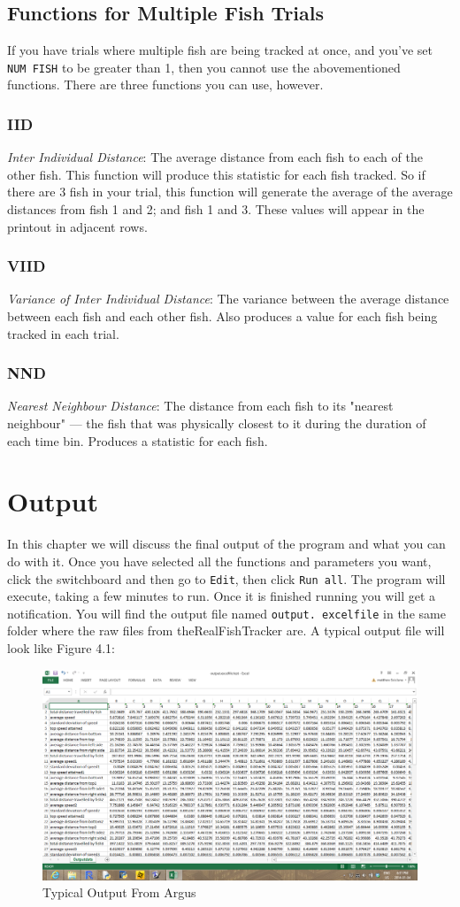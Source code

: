 \documentclass[12pt,titlepage]{report}
\begin{document}
\section{Functions for Multiple Fish Trials}
If you have trials where multiple fish are being tracked at once, and you've set \texttt{NUM FISH}  to be greater than 1, then you cannot use the abovementioned functions. There are three functions you can use, however.
\subsection{IID}
\emph{Inter Individual Distance}: The average distance from each fish to each of the other fish. This function will produce this statistic for each fish tracked. So if there are 3 fish in your trial, this function will generate the average of the average distances from fish 1 and 2; and fish 1 and 3. These values will appear in the printout in adjacent rows.
\subsection{VIID}
\emph{Variance of Inter Individual Distance}: The variance between the average distance between each fish and each other fish. Also produces a value for each fish being tracked in each trial.
\subsection{NND}
\emph{Nearest Neighbour Distance}: The distance from each fish to its "nearest neighbour" --- the fish that was physically closest to it during the duration of each time bin. Produces a statistic for each fish.
\ 
\chapter{Output}
In this chapter we will discuss the final output of the program and what you can do with it. Once you have selected all the functions and parameters you want, click the switchboard and then go to \texttt{Edit}, then click \texttt{Run all}. The program will execute, taking a few minutes to run. Once it is finished running you will get a notification. You will find the output file named \texttt{output. excelfile} in the same folder where the raw files from theRealFishTracker are. A typical output file will look like Figure 4.1:

\begin{figure}[ht!]
\centering
\includegraphics[width=120mm]{image10.png}
\caption{Typical Output From Argus}
\label{overflow}
\end{figure}
\pagebreak
\end{document}
